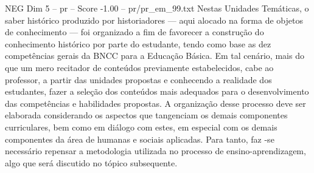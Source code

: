 \begin{textsample}{NEG Dim 5 – pr – Score -1.00 – pr/pr\_em\_99.txt}
Nestas Unidades Temáticas, o saber histórico produzido por historiadores — aqui alocado na forma de objetos de conhecimento — foi organizado a fim de favorecer a construção do conhecimento histórico por parte do estudante, tendo como base as dez competências gerais da BNCC para a Educação Básica.
Em tal cenário, mais do que um mero recitador de conteúdos previamente estabelecidos, cabe ao professor, a partir das unidades propostas e conhecendo a realidade dos estudantes, fazer a seleção dos conteúdos mais adequados para o desenvolvimento das competências e habilidades propostas.
A organização desse processo deve ser elaborada considerando os aspectos que tangenciam os demais componentes curriculares, bem como em diálogo com estes, em especial com os demais componentes da área de humanas e sociais aplicadas.
Para tanto, faz -se necessário repensar a metodologia utilizada no processo de ensino-aprendizagem, algo que será discutido no tópico subsequente.

\end{textsample}
